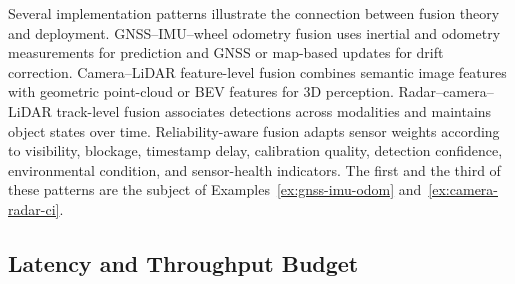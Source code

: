 \documentclass[graybox,envcountchap]{style/SNmono}
\begin{document}
Several implementation patterns illustrate the connection between fusion theory and deployment. GNSS--IMU--wheel odometry fusion uses inertial and odometry measurements for prediction and GNSS or map-based updates for drift correction. Camera--LiDAR feature-level fusion combines semantic image features with geometric point-cloud or BEV features for 3D perception. Radar--camera--LiDAR track-level fusion associates detections across modalities and maintains object states over time. Reliability-aware fusion adapts sensor weights according to visibility, blockage, timestamp delay, calibration quality, detection confidence, environmental condition, and sensor-health indicators. The first and the third of these patterns are the subject of Examples~\ref{ex:gnss-imu-odom} and~\ref{ex:camera-radar-ci}.

\subsection{Latency and Throughput Budget}
\label{subsec:latency}
\end{document}
